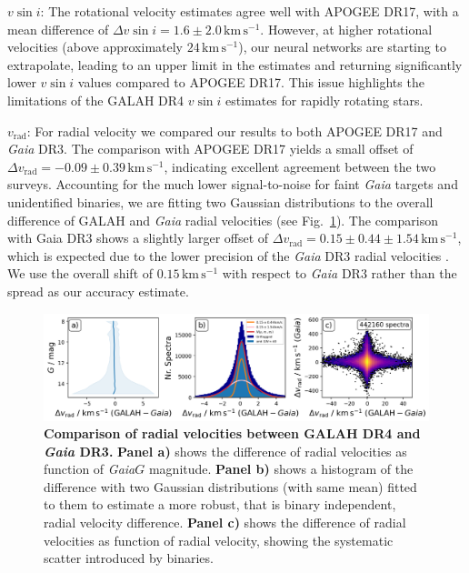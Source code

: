 \documentclass[
  journal=pasa,
  manuscript=research-paper, %
  year=2024,
  volume=37
]{cup-journal}
\newcommand{\vsini}{$v \sin i$\xspace}
\newcommand{\vrad}{$v_\mathrm{rad}$\xspace}
\newcommand{\Gaia}{\textit{Gaia}\xspace}
\begin{document}
\vsini: The rotational velocity estimates agree well with APOGEE DR17, with a mean difference of $\Delta v \sin i = 1.6 \pm 2.0\,\mathrm{km\,s^{-1}}$. However, at higher rotational velocities (above approximately $24\,\mathrm{km\,s^{-1}}$), our neural networks are starting to extrapolate, leading to an upper limit in the estimates and returning significantly lower \vsini values compared to APOGEE DR17. This issue highlights the limitations of the GALAH DR4 \vsini estimates for rapidly rotating stars.

\vrad: For radial velocity we compared our results to both APOGEE DR17 and \Gaia DR3. The comparison with APOGEE DR17 yields a small offset of $\Delta v_\mathrm{rad} = -0.09 \pm 0.39\,\mathrm{km\,s^{-1}}$, indicating excellent agreement between the two surveys. Accounting for the much lower signal-to-noise for faint \Gaia targets and unidentified binaries, we are fitting two Gaussian distributions to the overall difference of GALAH and \Gaia radial velocities (see Fig.~\ref{fig:galah_dr4_vrad_gaia_dr3}). The comparison with Gaia DR3 shows a slightly larger offset of $\Delta v_\mathrm{rad} = 0.15 \pm 0.44 \pm 1.54\,\mathrm{km\,s^{-1}}$, which is expected due to the lower precision of the \Gaia DR3 radial velocities \citep{Katz2023}. We use the overall shift of $0.15\,\mathrm{km\,s^{-1}}$ with respect to \Gaia DR3 rather than the spread as our accuracy estimate.

\begin{figure}[ht]
 \centering
 \includegraphics[width=\textwidth]{figures/galah_dr4_vrad_gaia_dr3.png}
 \caption{\textbf{Comparison of radial velocities between GALAH DR4 and \Gaia DR3.}
 \textbf{Panel a)} shows the difference of radial velocities as function of \Gaia $G$ magnitude.
 \textbf{Panel b)} shows a histogram of the difference with two Gaussian distributions (with same mean) fitted to them to estimate a more robust, that is binary independent, radial velocity difference.
 \textbf{Panel c)} shows the difference of radial velocities as function of radial velocity, showing the systematic scatter introduced by binaries.
}
 \label{fig:galah_dr4_vrad_gaia_dr3}
\end{figure}
\end{document}
